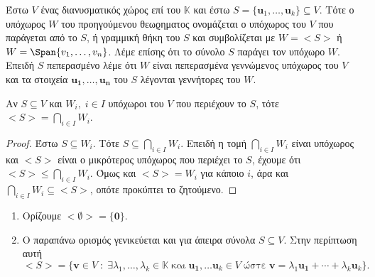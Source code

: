 \begin{dfn}
  Έστω $ V $ ένας διανυσματικός χώρος επί του $ \mathbb{K} $ και έστω $ S = 
  \{ \mathbf{u}_{1}, \ldots, \mathbf{u}_{k} \} \subseteq V$. Τότε ο υπόχωρος $ W $ 
  του προηγούμενου θεωϱηματος ονομάζεται ο υπόχωρος του $V$ που 
  \textcolor{Col2}{παράγεται} από το $ S $, ή γραμμική θήκη του $S$ και 
  συμβολίζεται με $ W = < S > $ ή $ W = \Span \{ v_{1},\ldots,v_{n}  \}  $.  
  Λέμε επίσης ότι το σύνολο $S$ \textcolor{Col2}{παράγει} τον υπόχωρο $W$. 
  Επειδή $S$  πεπερασμένο λέμε ότι $W$ είναι \textcolor{Col2}{πεπερασμένα 
  γεννώμενος} υπόχωρος του  $V$ και τα στοιχεία 
  $ \mathbf{u_{1}}, \ldots, \mathbf{u_{n}} $ του $S$ λέγονται 
  \textcolor{Col2}{γεννήτορες} του $W$.
\end{dfn}

\begin{prop}
\item {}
  Αν $ S \subseteq V $ και $ W_{i}, \; i \in I $ 
  υπόχωροι του $V$ που περιέχουν το $S$, τότε $ < S > = \bigcap_{i \in I} W_{i} $. 
\end{prop}
\begin{proof}
\item {}
  Έστω $ S \subseteq W_{i} $. Τότε $ S \subseteq \bigcap_{i \in I} W_{i} $. Επειδή 
  η τομή $  \bigcap_{i \in I} W_{i} $ είναι υπόχωρος και $ < S >  $ είναι ο 
  μικρότερος υπόχωρος που περιέχει το $S$, έχουμε ότι 
  $ < S > \leq \bigcap_{i \in I} W_{i}   $. Όμως και $ < S > = W_{i}  $ για κάποιο 
  $i$, άρα και $ \bigcap_{i \in Ι} W_{i} \subseteq < S >  $, οπότε προκύπτει το 
  ζητούμενο.
\end{proof}

\begin{rem}
\item {}
  \begin{enumerate}
    \item Ορίζουμε $ < \emptyset > = \{ \mathbf{0} \}  $. 
    \item Ο παραπάνω ορισμός γενικεύεται και για άπειρα σύνολα $ S \subseteq V $. 
      Στην περίπτωση αυτή 
      \[ 
        < S > = \{ \mathbf{v} \in V \; : \; \exists \lambda _{1}, 
          \ldots, \lambda _{k} \in \mathbb{K} \; \text{και} \; 
          \mathbf{u_{1}}, \ldots \mathbf{u}_{k} \in V \; 
          \text{ώστε} \; \mathbf{v} = \lambda _{1} \mathbf{u_{1}} + 
        \cdots + \lambda _{k} \mathbf{u}_{k}\}.
  \]
    \end{enumerate}
\end{rem}


